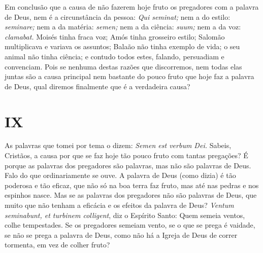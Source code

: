 Em conclusão que a causa de não fazerem hoje fruto os pregadores com a
palavra de Deus, nem é a circunstância da pessoa: \emph{Qui seminat;}
nem a do estilo: \emph{seminare;} nem a da matéria: \emph{semen;} nem a
da ciência: \emph{suum;} nem a da voz: \emph{clamabat.} Moisés tinha
fraca voz; Amós tinha grosseiro estilo; Salomão multiplicava e variava
os assuntos; Balaão não tinha exemplo de vida; o seu animal não tinha
ciência; e contudo todos estes, falando, persuadiam e convenciam. Pois
se nenhuma destas razões que discorremos, nem todas elas juntas são a
causa principal nem bastante do pouco fruto que hoje faz a palavra de
Deus, qual diremos finalmente que é a verdadeira causa?

\section*{IX}

As palavras que tomei por tema o dizem: \emph{Semen est verbum Dei.}
Sabeis, Cristãos, a causa por que se faz hoje tão pouco fruto com tantas
pregações? É porque as palavras dos pregadores são palavras, mas
não são palavras de Deus. Falo do que ordinariamente se ouve. A palavra
de Deus (como dizia) é tão poderosa e tão eficaz, que não só na boa
terra faz fruto, mas até nas pedras e nos espinhos nasce. Mas se as
palavras dos pregadores não são palavras de Deus, que muito que não
tenham a eficácia e os efeitos da palavra de Deus? \emph{Ventum
seminabunt, et turbinem colligent}, diz o Espírito Santo: Quem
semeia ventos, colhe tempestades. Se os pregadores semeiam vento, se o
que se prega é vaidade, se não se prega a palavra de Deus, como não há a
Igreja de Deus de correr tormenta, em vez de colher fruto?

